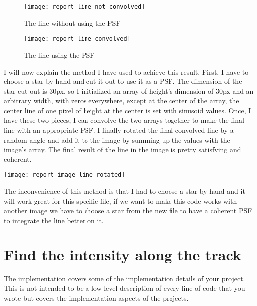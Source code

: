 \documentclass[a4paper,12pt,oneside]{report}
\begin{document}


\begin{figure}[h]
    \begin{minipage}[c]{.5\linewidth}
        \centering
        \texttt{[image: report\_line\_not\_convolved]}
        \caption{The line without using the PSF}
    \end{minipage}
    \hfill
    \begin{minipage}[c]{.5\linewidth}
        \centering
        \texttt{[image: report\_line\_convolved]}
        \caption{The line using the PSF}
    \end{minipage}
\end{figure}

I will now explain the method I have used to achieve this result. First, I have to choose a star by hand and cut it out to use it as a PSF.
The dimension of the star cut out is 30px, so I initialized an array of height's dimension of 30px and an arbitrary width, with zeros everywhere,
except at the center of the array, the center line of one pixel of height at the center is set with sinusoid values. Once, I have these two pieces,
I can convolve the two arrays together to make the final line with an appropriate PSF. I finally rotated the final convolved line by a random angle
and add it to the image by summing up the values with the image's array. The final result of the line in the image is pretty satisfying and coherent.
\begin{center}
    \texttt{[image: report\_image\_line\_rotated]}
    \label{lineOnImage}
\end{center}
The inconvenience of this method is that I had to choose a star by hand and it will work great for this specific file, if we want to make this code 
works with another image we have to choose a star from the new file to have a coherent PSF to integrate the line better on it.


\chapter{Find the intensity along the track}

The implementation covers some of the implementation details of your project.
This is not intended to be a low-level description of every line of code that
you wrote but covers the implementation aspects of the projects.
\end{document}
